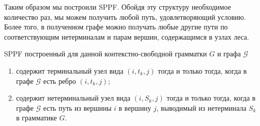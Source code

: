 \begin{example}
\begin{center}
{
    }
    \end{center}

    Таким образом мы построили SPPF. Обойдя эту структуру необходимое количество раз, мы можем получить любой путь, удовлетворяющий условию. Более того, в полученном графе можно получать любые другие пути по соответствующим нетерминалам и парам вершин, содержащимся в узлах леса.
    \end{example}

    \begin{note}
    SPPF построенный для данной контекстно-свободной грамматки $G$ и графа $\mathcal{G}$
    \begin{enumerate}
      \item содержит терминальный узел вида $(i,t_k,j)$ тогда и только тогда, когда в графе $\mathcal{G}$ есть ребро $(i,t_k,j)$;
      \item содержит нетерминальный узел вида $(i,S_k,j)$ тогда и только тогда, когда в графе $\mathcal{G}$ есть путь из вершины $i$ в вершину $j$, выводимый из нетерминала $S_k$ в грамматике $G$.
    \end{enumerate}
    \end{note}

